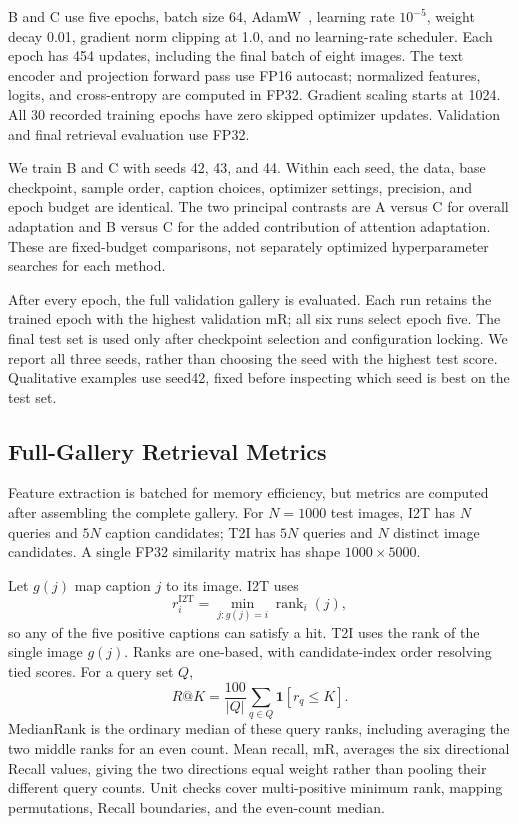 \documentclass[conference]{IEEEtran}
\begin{document}
B and C use five epochs, batch size 64, AdamW~\cite{loshchilov2019adamw}, learning rate $10^{-5}$, weight decay 0.01, gradient norm clipping at 1.0, and no learning-rate scheduler. Each epoch has 454 updates, including the final batch of eight images. The text encoder and projection forward pass use FP16 autocast; normalized features, logits, and cross-entropy are computed in FP32. Gradient scaling starts at 1024. All 30 recorded training epochs have zero skipped optimizer updates. Validation and final retrieval evaluation use FP32.

We train B and C with seeds 42, 43, and 44. Within each seed, the data, base checkpoint, sample order, caption choices, optimizer settings, precision, and epoch budget are identical. The two principal contrasts are A versus C for overall adaptation and B versus C for the added contribution of attention adaptation. These are fixed-budget comparisons, not separately optimized hyperparameter searches for each method.

After every epoch, the full validation gallery is evaluated. Each run retains the trained epoch with the highest validation mR; all six runs select epoch five. The final test set is used only after checkpoint selection and configuration locking. We report all three seeds, rather than choosing the seed with the highest test score. Qualitative examples use seed42, fixed before inspecting which seed is best on the test set.

\subsection{Full-Gallery Retrieval Metrics}
Feature extraction is batched for memory efficiency, but metrics are computed after assembling the complete gallery. For $N=1000$ test images, I2T has $N$ queries and $5N$ caption candidates; T2I has $5N$ queries and $N$ distinct image candidates. A single FP32 similarity matrix has shape $1000\times5000$.

Let $g(j)$ map caption $j$ to its image. I2T uses
\begin{equation}
 r_i^{\mathrm{I2T}}=\min_{j:g(j)=i}\operatorname{rank}_{i}(j),
\end{equation}
so any of the five positive captions can satisfy a hit. T2I uses the rank of the single image $g(j)$. Ranks are one-based, with candidate-index order resolving tied scores. For a query set $Q$,
\begin{equation}
 R@K=\frac{100}{|Q|}\sum_{q\in Q}\mathbf{1}[r_q\leq K].
\end{equation}
MedianRank is the ordinary median of these query ranks, including averaging the two middle ranks for an even count. Mean recall, mR, averages the six directional Recall values, giving the two directions equal weight rather than pooling their different query counts. Unit checks cover multi-positive minimum rank, mapping permutations, Recall boundaries, and the even-count median.
\end{document}
